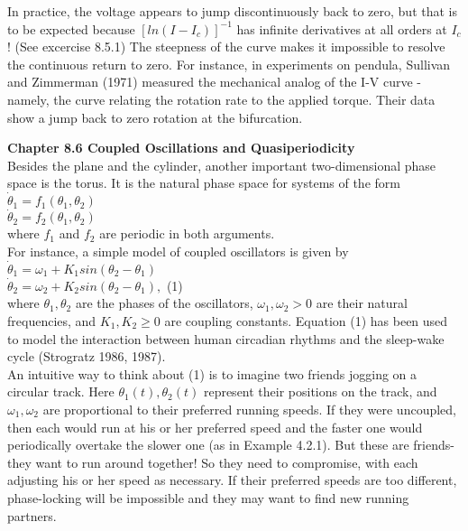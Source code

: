 \documentclass{article}
\newcommand\tab[1][1cm]{\hspace*{#1}}
\begin{document}
\tab In practice, the voltage appears to jump discontinuously back to zero, but that is to be expected because $[ln(I-I_{c})]^{-1}$ has infinite derivatives at all orders at $I_{c}$! (See excercise 8.5.1) The steepness of the curve makes it impossible to resolve the continuous return to zero. For instance, in experiments on pendula, Sullivan and Zimmerman (1971) measured the mechanical analog of the I-V curve - namely, the curve relating the rotation rate to the applied torque. Their data show a jump back to zero rotation at the bifurcation. 

\textbf {Chapter 8.6 Coupled Oscillations and Quasiperiodicity} \\
Besides the plane and the cylinder, another important two-dimensional phase space is the torus. It is the natural phase space for systems of the form \\ \tab \tab
$\dot{\theta}_{1}=f_{1}(\theta_{1},\theta_{2})$ \\ \tab \tab
$\dot{\theta}_{2}=f_{2}(\theta_{1}, \theta_{2})$ \\
where $f_{1}$ and $f_{2}$ are periodic in both arguments. \\

For instance, a simple model of coupled oscillators is given by \\ \tab \tab
$\dot{\theta}_{1}=\omega_{1}+K_{1}sin(\theta_{2} - \theta_{1})$ \\ \tab \tab
$\dot{\theta}_{2}=\omega_{2}+K_{2}sin(\theta_{2}-\theta_{1}),$ \tab (1) \\

where $\theta_{1}, \theta_{2}$ are the phases of the oscillators, $\omega_{1}, \omega_{2}>0$ are their natural frequencies, and $K_{1}, K_{2} \geq 0$ are coupling constants. Equation (1) has been used to model the interaction between human circadian rhythms and the sleep-wake cycle (Strogratz 1986, 1987). \\ \tab
An intuitive way to think about (1) is to imagine two friends jogging on a circular track. Here $\theta_{1}(t), \theta_{2}(t)$ represent their positions on the track, and $\omega_{1}, \omega_{2}$ are proportional to their preferred running speeds. If they were uncoupled, then each would run at his or her preferred speed and the faster one would periodically overtake the slower one (as in Example 4.2.1). But these are friends-they want to run around together! So they need to compromise, with each adjusting his or her speed as necessary. If their preferred speeds are too different, phase-locking will be impossible and they may want to find new running partners. \\ \tab 
\end{document}
